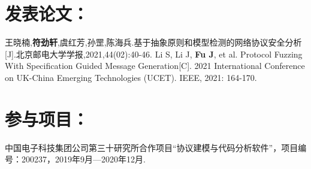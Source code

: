 \documentclass[master]{thesis-uestc}
\begin{document}

\titlespacing{\section}{-24pt}{18pt}{6pt}
\begin{thesistheaccomplish}
	
	
	\section*{发表论文：}
	\bibitem[1]{} 王晓楠,\textbf{符劲轩},虞红芳,孙罡,陈海兵.基于抽象原则和模型检测的网络协议安全分析[J].北京邮电大学学报,2021,44(02):40-46.
	\bibitem[2]{} Li S, Li J, \textbf{Fu J}, et al. Protocol Fuzzing With Specification Guided Message Generation[C]. 2021 International Conference on UK-China Emerging Technologies (UCET). IEEE, 2021: 164-170.

	
	\section*{参与项目：}
	\bibitem[1]{} 中国电子科技集团公司第三十研究所合作项目“协议建模与代码分析软件”，项目编号：200237，2019年9月—2020年12月.
	
\end{thesistheaccomplish}
\titlespacing{\section}{0pt}{18pt}{6pt}

\end{document}
